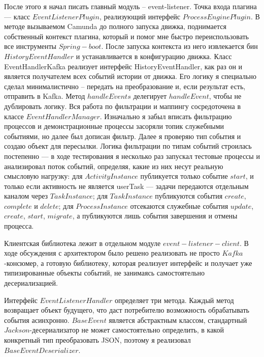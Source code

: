 После этого я начал писать главный модуль -- event-listener.                                
Точка входа плагина — класс $EventListenerPlugin$, реализующий интерфейс         
$ProcessEnginePlugin$. В методе вызываемом Camunda до полного запуска движка, поднимается собственный контекст плагина, который и помог мне быстро переиспользовать
все инструменты $Spring-boot$. После запуска контекста из него
извлекается бин $HistoryEventHandler$ и устанавливается в конфигурацию движка.
Класс EventHandlerKafka реализует интерфейс HistoryEventHandler, как раз он и является
получателем всех событий истории от движка.
Его логику я специально сделал минималистично -- передать на преобразование и, если результат есть, отправить в Kafka. 
Метод $handleEvents$ делегирует $handleEvent$, чтобы не
дублировать логику. Вся работа по фильтрации и маппингу сосредоточена в классе $EventHandlerManager$.
Изначально я забыл вписать фильтрацию процессов и демонстрационные процессы засоряли топик служебными событиями, но далее был дописан фильтр.                                                                   
Далее я проверяю тип события и создаю объект для пересылки. Логика фильтрации по типам событий строилась постепенно — в ходе тестирования я несколько раз запускал тестовые
процессы и анализировал поток событий, определяя, какие из них несут реальную
смысловую нагрузку: для $ActivityInstance$ публикуется только событие $start$, и только если         
активность не является userTask — задачи передаются отдельным каналом через $TaskInstance$;
для $TaskInstance$ публикуются события $create$, $complete$ и $delete$;
для $ProcessInstance$ отсекаются служебные события $update$, $create$, $start$,      
$migrate$, а публикуются лишь события завершения и отмены процесса.

Клиентская библиотека лежит в отдельном модуле $event-listener-client$.
В ходе обсуждения с архитектором было решено реализовать не
просто $Kafka$-консюмер, а готовую библиотеку, которая реализует интерфейс и получает уже
типизированные объекты событий, не занимаясь самостоятельно десериализацией.

Интерфейс $EventListenerHandler$ определяет три метода. Каждый метод
возвращает объект будущего, что даст потребителю возможность
обрабатывать события асинхронно. $BaseEvent$ является абстрактным классом, стандартный
$Jackson$-десериализатор не может самостоятельно определить, в какой
конкретный тип преобразовать JSON, поэтому я реализовал
$BaseEventDeserializer$.

